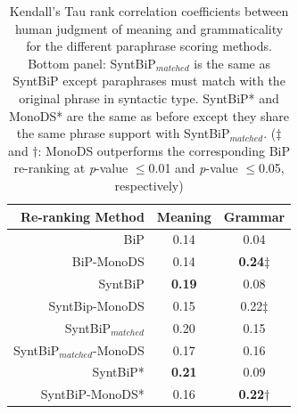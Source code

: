 \documentclass[11pt]{article}
\begin{document}

\begin{table}%
\begin{center}
\begin{tabular}{rcc}%
\hline\hline \bf \footnotesize Re-ranking Method & \bf \footnotesize Meaning & \bf \footnotesize Grammar \\ \hline
{\scriptsize BiP} & {\scriptsize 0.14} & {\scriptsize 0.04} \\
{\scriptsize BiP-MonoDS} & {\scriptsize 0.14} & {\scriptsize \bf 0.24$\ddagger$} \\
{\scriptsize SyntBiP} & {\scriptsize \bf 0.19}& {\scriptsize 0.08} \\
{\scriptsize SyntBip-MonoDS} & {\scriptsize 0.15} & {\scriptsize 0.22$\ddagger$} \\
\hline 
{\scriptsize SyntBiP$_{matched}$} &  {\scriptsize 0.20} & {\scriptsize 0.15} \\
{\scriptsize SyntBiP$_{matched}$-MonoDS}&  {\scriptsize 0.17} & {\scriptsize 0.16} \\
{\scriptsize SyntBiP*} &  {\scriptsize \bf 0.21} & {\scriptsize 0.09} \\
{\scriptsize SyntBiP-MonoDS*}&  {\scriptsize 0.16} & {\scriptsize \bf 0.22$\dagger$} \\
\hline
\end{tabular}
\end{center}
\caption{Kendall's Tau rank correlation coefficients between human judgment of meaning and grammaticality for the different paraphrase scoring methods. Bottom panel: SyntBiP$_{matched}$ is the same as SyntBiP except paraphrases must match with the original phrase in syntactic type. SyntBiP* and MonoDS* are the same as before except they share the same phrase support with SyntBiP$_{matched}$. ($\ddagger$ and $\dagger$: MonoDS outperforms the corresponding BiP re-ranking at \emph{p}-value $\le$0.01 and \emph{p}-value $\le$0.05, respectively)}
\label{tbl:table4} 
\end{table}
%
%
\end{document}

